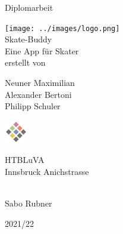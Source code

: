 \begin{titlepage}
	\begin{center}
		\Large{Diplomarbeit} \\

		\bigskip
		\bigskip
		\bigskip

		\texttt{[image: ../images/logo.png]} \\
		\Huge{Skate-Buddy} \\
		\bigskip
		\bigskip
		\bigskip
		\huge{Eine App für Skater} \\

		\bigskip
		\bigskip
		\bigskip
		\large{erstellt von} \\

		\bigskip
		\bigskip
		\bigskip

		\Huge{Neuner Maximilian} \\
		\Huge{Alexander Bertoni} \\
		\Huge{Philipp Schuler} \\
		\bigskip
		\bigskip
		\bigskip


		\bigskip
		\bigskip

		\includegraphics[width=1cm]{../images/htl-logo}

		\Large{HTBLuVA} \\
		\Large{Innsbruck Anichstrasse} \\

		\bigskip
		\bigskip
		\bigskip

		 \\
		Sabo Rubner

		\bigskip
		\bigskip
		\bigskip
		\bigskip

		\Large{2021/22}

	\end{center}

\end{titlepage}
